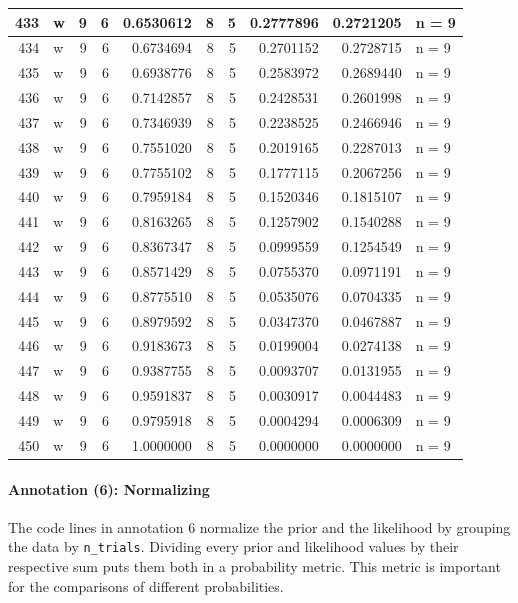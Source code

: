 \documentclass[
  letterpaper,
  DIV=11,
  numbers=noendperiod]{scrreprt}
\let\oldparagraph\paragraph
\renewcommand{\paragraph}[1]{\oldparagraph{#1}\mbox{}}
\begin{document}
\begin{table}
\begin{tabular}[t]{r|l|r|r|r|r|r|r|r|l}
\hline
433 & w & 9 & 6 & 0.6530612 & 8 & 5 & 0.2777896 & 0.2721205 & n = 9\\
\hline
434 & w & 9 & 6 & 0.6734694 & 8 & 5 & 0.2701152 & 0.2728715 & n = 9\\
\hline
435 & w & 9 & 6 & 0.6938776 & 8 & 5 & 0.2583972 & 0.2689440 & n = 9\\
\hline
436 & w & 9 & 6 & 0.7142857 & 8 & 5 & 0.2428531 & 0.2601998 & n = 9\\
\hline
437 & w & 9 & 6 & 0.7346939 & 8 & 5 & 0.2238525 & 0.2466946 & n = 9\\
\hline
438 & w & 9 & 6 & 0.7551020 & 8 & 5 & 0.2019165 & 0.2287013 & n = 9\\
\hline
439 & w & 9 & 6 & 0.7755102 & 8 & 5 & 0.1777115 & 0.2067256 & n = 9\\
\hline
440 & w & 9 & 6 & 0.7959184 & 8 & 5 & 0.1520346 & 0.1815107 & n = 9\\
\hline
441 & w & 9 & 6 & 0.8163265 & 8 & 5 & 0.1257902 & 0.1540288 & n = 9\\
\hline
442 & w & 9 & 6 & 0.8367347 & 8 & 5 & 0.0999559 & 0.1254549 & n = 9\\
\hline
443 & w & 9 & 6 & 0.8571429 & 8 & 5 & 0.0755370 & 0.0971191 & n = 9\\
\hline
444 & w & 9 & 6 & 0.8775510 & 8 & 5 & 0.0535076 & 0.0704335 & n = 9\\
\hline
445 & w & 9 & 6 & 0.8979592 & 8 & 5 & 0.0347370 & 0.0467887 & n = 9\\
\hline
446 & w & 9 & 6 & 0.9183673 & 8 & 5 & 0.0199004 & 0.0274138 & n = 9\\
\hline
447 & w & 9 & 6 & 0.9387755 & 8 & 5 & 0.0093707 & 0.0131955 & n = 9\\
\hline
448 & w & 9 & 6 & 0.9591837 & 8 & 5 & 0.0030917 & 0.0044483 & n = 9\\
\hline
449 & w & 9 & 6 & 0.9795918 & 8 & 5 & 0.0004294 & 0.0006309 & n = 9\\
\hline
450 & w & 9 & 6 & 1.0000000 & 8 & 5 & 0.0000000 & 0.0000000 & n = 9\\
\hline
\end{tabular}
\end{table}

\hypertarget{sec-annotation-6-normalize}{%
\paragraph{Annotation (6):
Normalizing}\label{sec-annotation-6-normalize}}

The code lines in annotation 6 normalize the prior and the likelihood by
grouping the data by \texttt{n\_trials}. Dividing every prior and
likelihood values by their respective sum puts them both in a
probability metric. This metric is important for the comparisons of
different probabilities.
\end{document}
